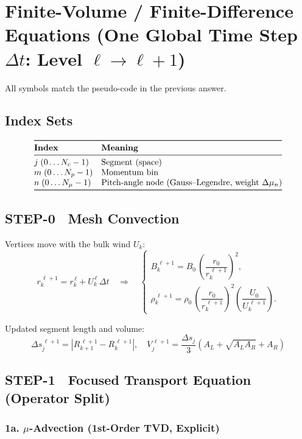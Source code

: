 {\section*{Finite-Volume / Finite-Difference Equations (One Global Time Step $\Delta t$: Level $\ell \rightarrow \ell+1$)}

All symbols match the pseudo-code in the previous answer.

\subsection*{Index Sets}
\[
\begin{array}{@{}ll@{}}
\toprule
\textbf{Index} & \textbf{Meaning} \\
\midrule
j\; (0 \dots N_c - 1) & \text{Segment (space)} \\
m\; (0 \dots N_p - 1) & \text{Momentum bin} \\
n\; (0 \dots N_\mu - 1) & \text{Pitch-angle node (Gauss–Legendre, weight } \Delta \mu_n) \\
\bottomrule
\end{array}
\]

\subsection*{STEP-0 Mesh Convection}

Vertices move with the bulk wind $U_k$:
\[
r_k^{\,\ell+1} = r_k^{\,\ell} + U_k^{\,\ell}\, \Delta t
\quad \Longrightarrow \quad
\begin{cases}
B_k^{\,\ell+1} = B_0\,\left(\dfrac{r_0}{r_k^{\,\ell+1}}\right)^2, \\[4pt]
\rho_k^{\,\ell+1} = \rho_0\,\left(\dfrac{r_0}{r_k^{\,\ell+1}}\right)^2 \left(\dfrac{U_0}{U_k^{\,\ell+1}}\right).
\end{cases}
\]

Updated segment length and volume:
\[
\boxed{
\Delta s_j^{\,\ell+1} = \left| R_{k+1}^{\,\ell+1} - R_k^{\,\ell+1} \right|, \quad
V_j^{\,\ell+1} = \frac{\Delta s_j}{3} \left( A_L + \sqrt{A_L A_R} + A_R \right)
}
\]

\subsection*{STEP-1 Focused Transport Equation (Operator Split)}

\subsubsection*{1a. $\mu$-Advection (1st-Order TVD, Explicit)}

}
